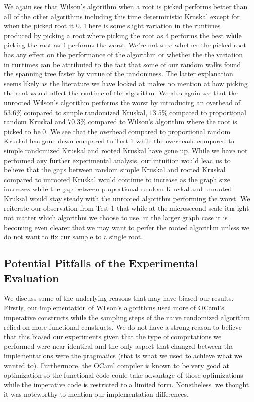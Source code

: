 \documentclass[11pt]{article}
\begin{document}
We again see that Wilson's algorithm when a root is picked performs better than all of the other algorithms including this time deterministic Kruskal except for when the picked root it $0$. There is some slight variation in the runtimes produced by picking a root where picking the root as $4$ performs the best while picking the root as $0$ performs the worst. We're not sure whether the picked root has any effect on the performance of the algorithm or whether the the variation in runtimes can be attributed to the fact that some of our random walks found the spanning tree faster by virtue of the randomness. The latter explanation seems likely as the literature we have looked at makes no mention at how picking the root would affect the runtime of the algorithm. We also again see that the unrooted Wilson's algorithm performs the worst by introducing an overhead of $53.6\%$ compared to simple randomized Kruskal, $13.5\%$ compared to proportional random Kruskal and $70.3\%$ compared to Wilson's algorithm where the root is picked to be $0$. We see that the overhead compared to proportional random Kruskal has gone down compared to Test 1 while the overheads compared to simple randomized Kruskal and rooted Kruskal have gone up. While we have not performed any further experimental analysis, our intuition would lead us to believe that the gaps between random simple Kruskal and rooted Kruskal compared to unrooted Kruskal would continue to increase as the graph size increases while the gap between proportional random Kruskal and unrooted Kruksal would stay steady with the unrooted algorithm performing the worst. We reiterate our observation from Test 1 that while at the microsecond scale itm ight not matter which algorithm we choose to use, in the larger graph case it is becoming even clearer that we may want to perfer the rooted algorithm unless we do not want to fix our sample to a single root.

\subsection{Potential Pitfalls of the Experimental Evaluation}

We discuss some of the underlying reasons that may have biased our results. Firstly, our implementation of Wilson's algorithms used more of OCaml's imperative constructs while the sampling steps of the naive randomized algorithm relied on more functional constructs. We do not have a strong reason to believe that this biased our experiments given that the type of computations we performed were near identical and the only aspect that changed between the implementations were the pragmatics (that is what we used to achieve what we wanted to). Furthermore, the OCaml compiler is known to be very good at optimization so the functional code could take advantage of those optimizations while the imperative code is restricted to a limited form. Nonetheless, we thought it was noteworthy to mention our implementation differences.
\end{document}
